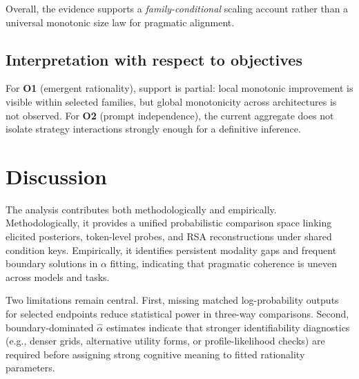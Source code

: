 \documentclass[11pt]{article}
\begin{document}
{Overall, the evidence supports a \emph{family-conditional} scaling account rather than a universal monotonic size law for pragmatic alignment.

\subsection{Interpretation with respect to objectives}

For \textbf{O1} (emergent rationality), support is partial: local monotonic improvement is visible within selected families, but global monotonicity across architectures is not observed. For \textbf{O2} (prompt independence), the current aggregate does not isolate strategy interactions strongly enough for a definitive inference.

\section{Discussion}

\label{Discussion}

The analysis contributes both methodologically and empirically. Methodologically, it provides a unified probabilistic comparison space linking elicited posteriors, token-level probes, and RSA reconstructions under shared condition keys. Empirically, it identifies persistent modality gaps and frequent boundary solutions in $\alpha$ fitting, indicating that pragmatic coherence is uneven across models and tasks.

Two limitations remain central. First, missing matched log-probability outputs for selected endpoints reduce statistical power in three-way comparisons. Second, boundary-dominated $\hat\alpha$ estimates indicate that stronger identifiability diagnostics (e.g., denser grids, alternative utility forms, or profile-likelihood checks) are required before assigning strong cognitive meaning to fitted rationality parameters.

\noindent\begingroup
\setlength{\fboxsep}{5pt}\setlength{\fboxrule}{0.6pt}
\endgroup



}
\end{document}
